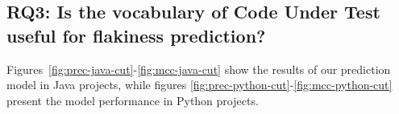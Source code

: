 \subsection{RQ3: Is the vocabulary of Code Under Test useful for flakiness prediction?}

Figures~\ref{fig:prec-java-cut}-\ref{fig:mcc-java-cut} show the results of our prediction model in Java projects, while figures \ref{fig:prec-python-cut}-\ref{fig:mcc-python-cut} present the model performance in Python projects. 


